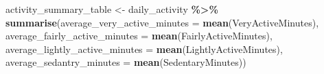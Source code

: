 \documentclass[
]{article}
\newenvironment{Shaded}{\begin{snugshade}}{\end{snugshade}}
\newcommand{\AttributeTok}[1]{\textcolor[rgb]{0.13,0.29,0.53}{#1}}
\newcommand{\FunctionTok}[1]{\textcolor[rgb]{0.13,0.29,0.53}{\textbf{#1}}}
\newcommand{\NormalTok}[1]{#1}
\newcommand{\OtherTok}[1]{\textcolor[rgb]{0.56,0.35,0.01}{#1}}
\newcommand{\SpecialCharTok}[1]{\textcolor[rgb]{0.81,0.36,0.00}{\textbf{#1}}}
\begin{document}
\begin{Shaded}
\begin{Highlighting}[]
\NormalTok{activity\_summary\_table }\OtherTok{\textless{}{-}}\NormalTok{ daily\_activity }\SpecialCharTok{\%\textgreater{}\%} \FunctionTok{summarise}\NormalTok{(}\AttributeTok{average\_very\_active\_minutes =} \FunctionTok{mean}\NormalTok{(VeryActiveMinutes), }\AttributeTok{average\_fairly\_active\_minutes =} \FunctionTok{mean}\NormalTok{(FairlyActiveMinutes), }\AttributeTok{average\_lightly\_active\_minutes =} \FunctionTok{mean}\NormalTok{(LightlyActiveMinutes), }\AttributeTok{average\_sedantry\_minutes =} \FunctionTok{mean}\NormalTok{(SedentaryMinutes))}
\end{Highlighting}
\end{Shaded}
\end{document}

